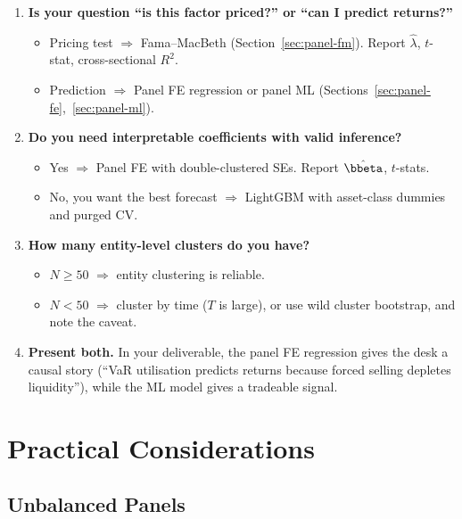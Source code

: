 \begin{enumerate}[leftmargin=*]
  \item \textbf{Is your question ``is this factor priced?'' or ``can I predict returns?''}
    \begin{itemize}[leftmargin=*]
      \item Pricing test $\Rightarrow$ Fama--MacBeth (Section~\ref{sec:panel-fm}). Report $\hat{\lambda}$, $t$-stat, cross-sectional $R^2$.
      \item Prediction $\Rightarrow$ Panel FE regression or panel ML (Sections~\ref{sec:panel-fe},~\ref{sec:panel-ml}).
    \end{itemize}
  \item \textbf{Do you need interpretable coefficients with valid inference?}
    \begin{itemize}[leftmargin=*]
      \item Yes $\Rightarrow$ Panel FE with double-clustered SEs. Report $\hat{\bbeta}$, $t$-stats.
      \item No, you want the best forecast $\Rightarrow$ LightGBM with asset-class dummies and purged CV.
    \end{itemize}
  \item \textbf{How many entity-level clusters do you have?}
    \begin{itemize}[leftmargin=*]
      \item $N \geq 50$ $\Rightarrow$ entity clustering is reliable.
      \item $N < 50$ $\Rightarrow$ cluster by time ($T$ is large), or use wild cluster bootstrap, and note the caveat.
    \end{itemize}
  \item \textbf{Present both.} In your deliverable, the panel FE regression gives the desk a causal story (``VaR utilisation predicts returns because forced selling depletes liquidity''), while the ML model gives a tradeable signal.
\end{enumerate}

\section{Practical Considerations}
\label{sec:panel-practical}

\subsection{Unbalanced Panels}

